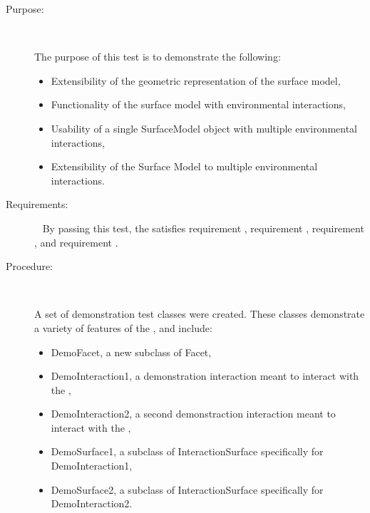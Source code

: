 \label{surfacemodel_demonstration}
\begin{description}
\item[Purpose:]\ \newline

The purpose of this test is to demonstrate the following:

\begin{itemize}
\item{Extensibility of the geometric representation of the surface model,}
\item{Functionality of the surface model with environmental interactions,}
\item{Usability of a single SurfaceModel object with multiple
environmental interactions,}
\item{Extensibility of the Surface Model to multiple environmental
interactions.}
\end{itemize}

\item[Requirements:]\ \newline
By passing this test, the \ModelDesc satisfies requirement
, requirement
, requirement
, and requirement
.

\item[Procedure:]\ \newline

A set of demonstration test classes were created. These classes
demonstrate a variety of features of the \ModelDesc, and
include:

\begin{itemize}
\item{DemoFacet}, a new subclass of Facet,
\item{DemoInteraction1}, a demonstration interaction meant to interact
with the \ModelDesc,
\item{DemoInteraction2}, a second demonstraction interaction meant
to interact with the \ModelDesc,
\item{DemoSurface1}, a subclass of InteractionSurface specifically
for DemoInteraction1,
\item{DemoSurface2}, a subclass of InteractionSurface specifically
for DemoInteraction2.
\end{itemize}


\end{description}
